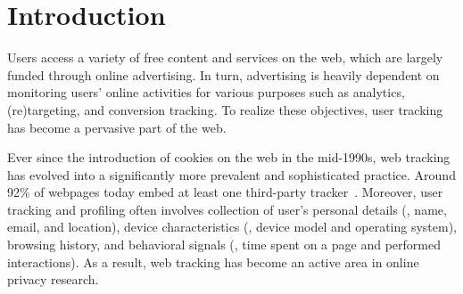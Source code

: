 \section{Introduction}
\label{sec:introduction}

Users access a variety of free content and services on the web, which are largely funded through online advertising.
%
In turn, advertising is heavily dependent on monitoring users' online activities for various purposes 
%
such as analytics, (re)targeting, and conversion tracking.
%
To realize these objectives, user tracking has become a pervasive part of the web.
%

Ever since the introduction of cookies on the web in the mid-1990s, web tracking has evolved into a significantly more prevalent and sophisticated practice.
%
Around 92\% of webpages today embed at least one third-party tracker~\cite{urban2024WebAlmanac2024}.
%
Moreover, user tracking and profiling often involves collection of user's personal details (\eg{}, name, email, and location), device characteristics (\eg{}, device model and operating system), browsing history, and behavioral signals (\eg{}, time spent on a page and performed interactions).
%
As a result, web tracking has become an active area in online privacy research.

